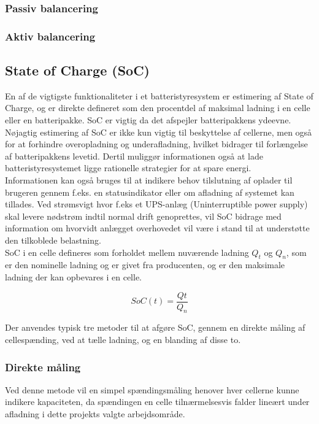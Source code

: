 \subsubsection{Passiv balancering}

\subsubsection{Aktiv balancering}

\subsection{State of Charge (SoC)}
En af de vigtigste funktionaliteter i et batteristyresystem er estimering af State of Charge, og er direkte defineret som den procentdel af maksimal ladning i en celle eller en batteripakke. SoC er vigtig da det afspejler batteripakkens ydeevne. Nøjagtig estimering af SoC er ikke kun vigtig til beskyttelse af cellerne, men også for at forhindre overopladning og underafladning, hvilket bidrager til forlængelse af batteripakkens levetid. Dertil muliggør informationen også at lade batteristyresystemet ligge rationelle strategier for at spare energi.
\\
Informationen kan også bruges til at indikere behov tilslutning af oplader til brugeren gennem f.eks. en statusindikator eller om afladning af systemet kan tillades. 
Ved strømsvigt hvor f.eks et UPS-anlæg (Uninterruptible power supply) skal levere nødstrøm indtil normal drift genoprettes, vil SoC bidrage med information om hvorvidt anlægget overhovedet vil være i stand til at understøtte den tilkoblede belastning.
\\

SoC i en celle defineres som forholdet mellem nuværende ladning $Q_{t}$ og $Q_{n}$, som er den nominelle ladning og er givet fra producenten, og er den maksimale ladning der kan opbevares i en celle.

\begin {equation} 
SoC(t) = \frac{Qt}{Q_n} \label{eq:soc}
\end {equation}

Der anvendes typisk tre metoder til at afgøre SoC, gennem en direkte måling af cellespænding, ved at tælle ladning, og en blanding af disse to.

\subsubsection{Direkte måling}
Ved denne metode vil en simpel spændingsmåling henover hver cellerne kunne indikere kapaciteten, da spændingen en celle tilnærmelsesvis falder lineært under afladning i dette projekts valgte arbejdsområde.

